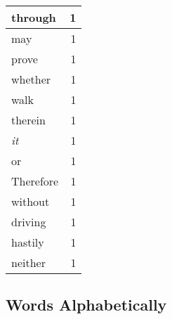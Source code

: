 \begin{center}
\begin{longtable}{l|r}
through & 1 \\ \hline
may & 1 \\ \hline
prove & 1 \\ \hline
whether & 1 \\ \hline
walk & 1 \\ \hline
therein & 1 \\ \hline
\emph{it} & 1 \\ \hline
or & 1 \\ \hline
Therefore & 1 \\ \hline
without & 1 \\ \hline
driving & 1 \\ \hline
hastily & 1 \\ \hline
neither & 1 \\ \hline
\end{longtable}
\end{center}



\normalsize



\subsection{Words Alphabetically}

